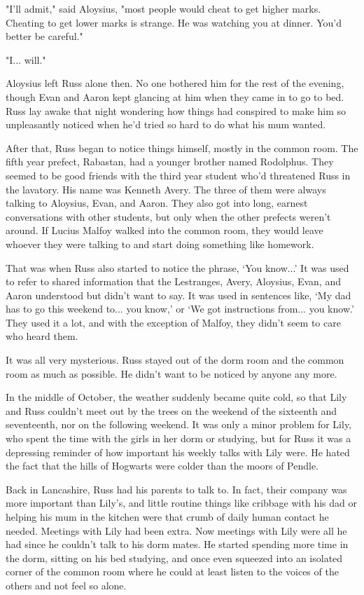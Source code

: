 \documentclass[a4paper,11pt]{article}
\begin{document}
"I'll admit," said Aloysius, "most people would cheat to get higher marks. Cheating to get lower marks is strange. He was watching you at dinner. You'd better be careful."

"I... will."

Aloysius left Russ alone then. No one bothered him for the rest of the evening, though Evan and Aaron kept glancing at him when they came in to go to bed. Russ lay awake that night wondering how things had conspired to make him so unpleasantly noticed when he'd tried so hard to do what his mum wanted.

After that, Russ began to notice things himself, mostly in the common room. The fifth year prefect, Rabastan, had a younger brother named Rodolphus. They seemed to be good friends with the third year student who'd threatened Russ in the lavatory. His name was Kenneth Avery. The three of them were always talking to Aloysius, Evan, and Aaron. They also got into long, earnest conversations with other students, but only when the other prefects weren't around. If Lucius Malfoy walked into the common room, they would leave whoever they were talking to and start doing something like homework.

That was when Russ also started to notice the phrase, `You know...' It was used to refer to shared information that the Lestranges, Avery, Aloysius, Evan, and Aaron understood but didn't want to say. It was used in sentences like, `My dad has to go this weekend to... you know,' or `We got instructions from... you know.' They used it a lot, and with the exception of Malfoy, they didn't seem to care who heard them.

It was all very mysterious. Russ stayed out of the dorm room and the common room as much as possible. He didn't want to be noticed by anyone any more.

In the middle of October, the weather suddenly became quite cold, so that Lily and Russ couldn't meet out by the trees on the weekend of the sixteenth and seventeenth, nor on the following weekend. It was only a minor problem for Lily, who spent the time with the girls in her dorm or studying, but for Russ it was a depressing reminder of how important his weekly talks with Lily were. He hated the fact that the hills of Hogwarts were colder than the moors of Pendle.

Back in Lancashire, Russ had his parents to talk to. In fact, their company was more important than Lily's, and little routine things like cribbage with his dad or helping his mum in the kitchen were that crumb of daily human contact he needed. Meetings with Lily had been extra. Now meetings with Lily were all he had since he couldn't talk to his dorm mates. He started spending more time in the dorm, sitting on his bed studying, and once even squeezed into an isolated corner of the common room where he could at least listen to the voices of the others and not feel so alone.
\end{document}
